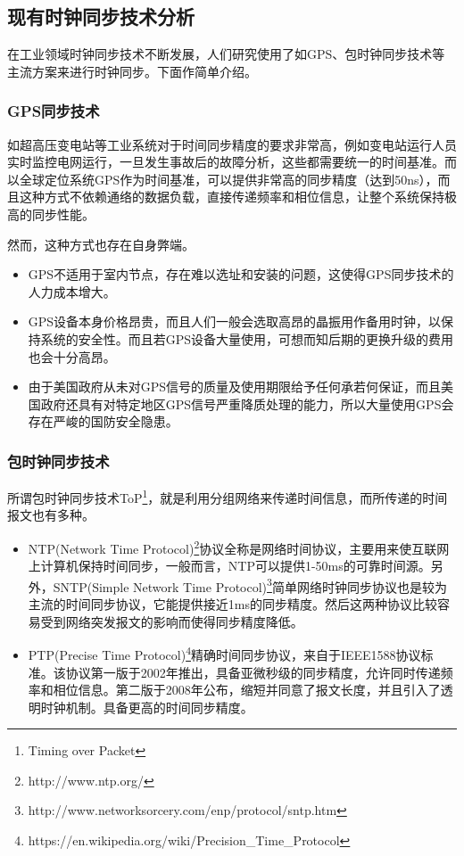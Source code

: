 \subsection{现有时钟同步技术分析}
\label{sec:sync_methods}
在工业领域时钟同步技术不断发展，人们研究使用了如GPS、包时钟同步技术等主流方案来进行时钟同步。下面作简单介绍。
\subsubsection{GPS同步技术}
如超高压变电站等工业系统对于时间同步精度的要求非常高，例如变电站运行人员实时监控电网运行，一旦发生事故后的故障分析，这些都需要统一的时间基准。而以全球定位系统GPS作为时间基准，可以提供非常高的同步精度（达到50ns），而且这种方式不依赖通络的数据负载，直接传递频率和相位信息，让整个系统保持极高的同步性能。

然而，这种方式也存在自身弊端。
\begin{itemize}[noitemsep,topsep=0pt,parsep=0pt,partopsep=0pt]
	\item GPS不适用于室内节点，存在难以选址和安装的问题，这使得GPS同步技术的人力成本增大。
	\item GPS设备本身价格昂贵，而且人们一般会选取高昂的晶振用作备用时钟，以保持系统的安全性。而且若GPS设备大量使用，可想而知后期的更换升级的费用也会十分高昂。
	\item 由于美国政府从未对GPS信号的质量及使用期限给予任何承若何保证，而且美国政府还具有对特定地区GPS信号严重降质处理的能力，所以大量使用GPS会存在严峻的国防安全隐患。
\end{itemize}

\subsubsection{包时钟同步技术}
所谓包时钟同步技术ToP\footnote{Timing over Packet}，就是利用分组网络来传递时间信息，而所传递的时间报文也有多种。
\begin{itemize}[noitemsep,topsep=0pt,parsep=0pt,partopsep=0pt]
	\item  NTP(Network Time Protocol)\footnote{http://www.ntp.org/}协议全称是网络时间协议，主要用来使互联网上计算机保持时间同步，一般而言，NTP可以提供1-50ms的可靠时间源。另外，SNTP(Simple Network Time Protocol)\footnote{http://www.networksorcery.com/enp/protocol/sntp.htm}简单网络时钟同步协议也是较为主流的时间同步协议，它能提供接近1ms的同步精度。然后这两种协议比较容易受到网络突发报文的影响而使得同步精度降低。
	\item PTP(Precise Time Protocol)\footnote{https://en.wikipedia.org/wiki/Precision\_Time\_Protocol}精确时间同步协议，来自于IEEE1588协议标准。该协议第一版于2002年推出，具备亚微秒级的同步精度，允许同时传递频率和相位信息。第二版于2008年公布，缩短并同意了报文长度，并且引入了透明时钟机制。具备更高的时间同步精度。
\end{itemize}


